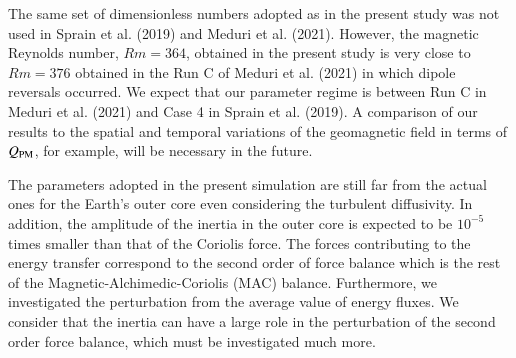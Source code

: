 {\color{red}
{\color{teal}
The same set of dimensionless numbers adopted as in the present study was not used in Sprain et al. (2019) and Meduri et al. (2021).
However, the magnetic Reynolds number, $Rm = 364$, obtained in the present study is very close to $Rm = 376$ obtained in the Run C of Meduri et al. (2021) in which dipole reversals occurred.
}
We expect that our parameter regime is between Run C in Meduri et al. (2021) and Case 4 in Sprain et al. (2019). 
}
{\color{teal}
A comparison of our results to the spatial and temporal variations of the geomagnetic field in terms of $Q_{\rm PM}$, for example, will be necessary in the future. 
}

{\color{blue}
{\color{teal}}
The parameters adopted in the present simulation are still far from the actual ones for the Earth's outer core even considering the turbulent diffusivity. 
In addition, the amplitude of the inertia in the outer core is expected to be $10^{-5}$ times smaller than that of the Coriolis force. 
The forces contributing to the energy transfer correspond to the second order of force balance which is the rest of the Magnetic-Alchimedic-Coriolis (MAC) balance. 
Furthermore, we investigated the perturbation from the average value of energy fluxes. 
{\color{teal}
We consider that the inertia can have a large role in the perturbation of the second order force balance, which must be investigated much more.
}
}

